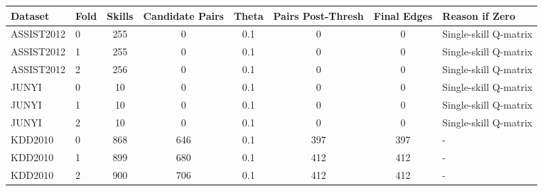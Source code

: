 \begin{tabular}{llcccccl}
\hline
Dataset & Fold & Skills & Candidate Pairs & Theta & Pairs Post-Thresh & Final Edges & Reason if Zero \\
\hline
ASSIST2012 & 0 & 255 & 0 & 0.1 & 0 & 0 & Single-skill Q-matrix \\
ASSIST2012 & 1 & 255 & 0 & 0.1 & 0 & 0 & Single-skill Q-matrix \\
ASSIST2012 & 2 & 256 & 0 & 0.1 & 0 & 0 & Single-skill Q-matrix \\
JUNYI & 0 & 10 & 0 & 0.1 & 0 & 0 & Single-skill Q-matrix \\
JUNYI & 1 & 10 & 0 & 0.1 & 0 & 0 & Single-skill Q-matrix \\
JUNYI & 2 & 10 & 0 & 0.1 & 0 & 0 & Single-skill Q-matrix \\
KDD2010 & 0 & 868 & 646 & 0.1 & 397 & 397 & - \\
KDD2010 & 1 & 899 & 680 & 0.1 & 412 & 412 & - \\
KDD2010 & 2 & 900 & 706 & 0.1 & 412 & 412 & - \\
\hline
\end{tabular}